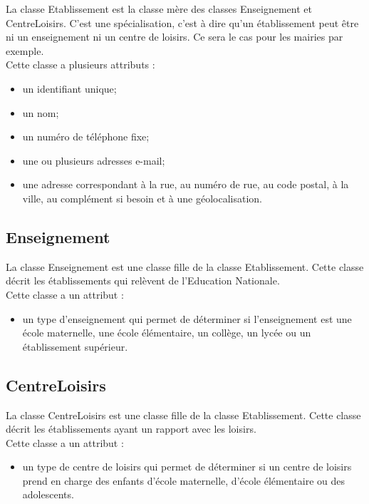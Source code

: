 \documentclass[asi, sansVersion]{picInsa}
\begin{document}
La classe Etablissement est la classe mère des classes Enseignement et CentreLoisirs. C'est une spécialisation, c'est à dire qu'un établissement peut être ni un enseignement ni un centre de loisirs. Ce sera le cas pour les mairies par exemple. \\
Cette classe a plusieurs attributs : 
\begin{itemize}
\item un identifiant unique;
\item un nom;
\item un numéro de téléphone fixe;
\item une ou plusieurs adresses e-mail;
\item une adresse correspondant à la rue, au numéro de rue, au code postal, à la ville, au complément si besoin et à une géolocalisation.
\end{itemize}

\subsection*{Enseignement}
La classe Enseignement est une classe fille de la classe Etablissement. Cette classe décrit les établissements qui relèvent de l'Education Nationale. \\
Cette classe a un attribut : 
\begin{itemize}
\item un type d'enseignement qui permet de déterminer si l'enseignement est une école maternelle, une école élémentaire, un collège, un lycée ou un établissement supérieur. 
\end{itemize} 


\subsection*{CentreLoisirs}
La classe CentreLoisirs est une classe fille de la classe Etablissement. Cette classe décrit les établissements ayant un rapport avec les loisirs. \\
Cette classe a un attribut : 
\begin{itemize}
\item un type de centre de loisirs qui permet de déterminer si un centre de loisirs prend en charge des enfants d'école maternelle, d'école élémentaire ou des adolescents.
\end{itemize}  
\end{document}
